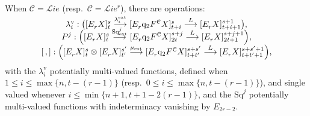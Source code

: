 \documentclass[11pt]{amsart} \renewcommand{\baselinestretch}{1.4}
\theoremstyle{plain}
\theoremstyle{definition}
\renewcommand{\to}{\longrightarrow}
\newcommand{\scrL}{\mathscr{L}}
\newcommand{\calc}{\mathcal{C}}
\newcommand{\quadgrad}[1]{\mathrm{q}_{#1}}
\newcommand{\Sq}{\mathrm{Sq}}
\newcommand{\liealgs}{{\scrL\!\textit{ie}}}
\newcommand{\restliealgs}{{\scrL\!\textit{ie}^\textit{r}}}
\newcommand{\Edownup}[5]{[E_{#1}^{#2}#3]^{#4}_{#5}}
\newcommand{\uver}{^\mathrm{v}}
\newcommand{\lambdav}{\lambda\uver}
\begin{document}
\begin{Operations on the Bousfield-Kan spectral sequence}
\begin{shaded}\tiny
When $\calc=\liealgs$ (resp.\ $\calc=\restliealgs$), there are operations:
\[\begin{tabular}{cll}
$\lambdav_i:\left(\Edownup{r}{}{X}{s}{t} \smash{{}\overset{\lambda_i^\textup{ext}}{\to}{}} \Edownup{r}{}{\quadgrad{2}F^\calc X}{s}{t+i}\smash{{}\overset{L}{\to} {}}
\Edownup{r}{}{X}{s+1}{t+i+1}\right)$,
\\
$P^{j}:\left(\Edownup{r}{}{X}{s}{t}   \smash{{}\overset{\Sq^j_\textup{ext}}{\to}{}} \Edownup{r}{}{\quadgrad{2}F^\calc X}{s+j}{2t}\smash{{}\overset{L}{\to} {}}
\Edownup{r}{}{X}{s+j+1}{2t+1}\right)$,\\
$[\,,]:\left(\Edownup{r}{}{X}{s}{t}\otimes \Edownup{r}{}{X}{s'}{t'}\smash{{}\overset{\mu_\textup{ext}}{\to}{}} \Edownup{r}{}{\quadgrad{2}F^\calc X}{s+s'}{t+t'}\smash{{}\overset{L}{\to} {}}
\Edownup{r}{}{X}{s+s'+1}{t+t'+1}\right)$,
\end{tabular}\]
with the $\lambdav_i$ potentially multi-valued functions,  defined when $1\leq i\leq \max\{n,t-(r-1)\}$ (resp.\ $0\leq i\leq \max\{n,t-(r-1)\}$), and single valued whenever $i\leq\min\{n+1,t+1-2(r-1)\}$, and the $\Sq^j$ potentially multi-valued functions with indeterminacy vanishing by $E_{2r-2}$.




\end{shaded}
\end{Operations on the Bousfield-Kan spectral sequence}
\end{document}
